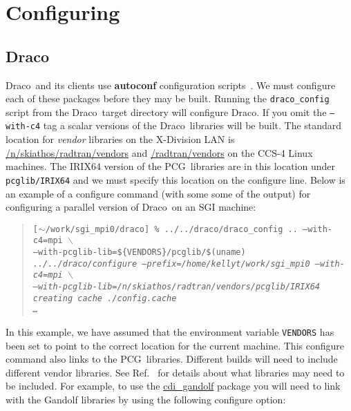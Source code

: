 \documentclass[10pt]{nmemo}
\newcommand{\comp}[1]{\normalfont\normalsize\texttt{#1}}
\newcommand{\draco}{{\normalfont\sffamily Draco}}
\newcommand{\pcg}{{\normalfont\sffamily PCG}}
\begin{document}

\section{Configuring}
\label{configure}

\subsection{\draco}

\draco\ and its clients use \textbf{autoconf} configuration
scripts~\cite{autoconf}.  We must configure each of these packages
before they may be built.  Running the \comp{draco\_config} script
from the \draco\ target directory will configure \draco.  If you omit
the \comp{--with-c4} tag a scalar versions of the \draco\ libraries
will be built.  The standard location for \emph{vendor} libraries on
the X-Division LAN is \url{/n/skiathos/radtran/vendors} and
\url{/radtran/vendors} on the CCS-4 Linux machines.  The IRIX64
version of the \pcg\ libraries are in this location under
\comp{pcglib/IRIX64} and we must specify this location on the
configure line.  Below is an example of a configure command (with some
some of the output) for configuring a parallel version of \draco\ on
an SGI machine:  

\footnotesize
\begin{verse}
\texttt{[$\sim$/work/sgi\_mpi0/draco] \% ../../draco/draco\_config .. --with-c4=mpi $\backslash$\\
\hspace{0.5in}--with-pcglib-lib=\$\{VENDORS\}/pcglib/\$(uname) \\
\emph{../../draco/configure --prefix=/home/kellyt/work/sgi\_mpi0 --with-c4=mpi $\backslash$\\
\hspace{0.5in}--with-pcglib-lib=/n/skiathos/radtran/vendors/pcglib/IRIX64\\
creating cache ./config.cache\\
\hspace{1.0in} \ldots }}
\end{verse}
\normalsize

In this example, we have assumed that the environment variable
\comp{VENDORS} has been set to point to the correct location for the
current machine. This configure command also links to the \pcg\ 
libraries.  Different builds will need to include different vendor
libraries.  See Ref.~\cite{draco-build} for details about what
libraries may need to be included.  For example, to use the
\url{cdi_gandolf} package you will need to link with the Gandolf
libraries by using the following configure option:
\end{document}
